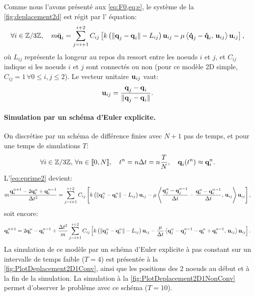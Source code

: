 \noindent Comme nous l'avons présenté aux \cref{eq:F0,eq:e}, le système de la \cref{fig:deplacement2d} est régit par l' équation:
\begin{align} \label{eq:eprime2}
    \forall i \in \mathbb{Z}/3\mathbb{Z}, \quad m \ddot{\bm{\mathrm{q}}}_i = \sum_{j=i+1}^{i+2}C_{ij} \left[  k \left( \Vert \bm{\mathrm{q}}_j - \bm{\mathrm{q}}_i \Vert - L_{ij} \right) \bm{\mathrm{u}}_{ij} - \mu \left\langle \bm{\mathrm{\dot{q}}}_j - \bm{\mathrm{\dot{q}}}_i, \, \bm{\mathrm{u}}_{ij}  \right\rangle  \bm{\mathrm{u}}_{ij}  \right]  , 
\end{align}
où $L_{ij}$ représente la longeur au repos du ressort entre les noeuds $i$ et $j$, et $C_{ij}$ indique si les noeuds $i$ et $j$ sont connectés ou non (pour ce modèle 2D simple, $C_{ij} = 1 \, \forall 0 \leq i,j \leq 2$). Le vecteur unitaire $\bm{\mathrm{u}}_{ij}$ vaut:
$$
\bm{\mathrm{u}}_{ij} = \frac{\bm{\mathrm{q}}_j - \bm{\mathrm{q}}_i}{\Vert \bm{\mathrm{q}}_j - \bm{\mathrm{q}}_i \Vert}.
$$


\paragraph{Simulation par un schéma d'Euler explicite.}

On discrétise par un schéma de différence finies avec $N+1$ pas de temps, et pour une temps de simulations $T$:
$$
\forall i \in \mathbb{Z}/3\mathbb{Z}, \, \forall n \in [\![ 0,N ]\!], \quad  t^n = n\Delta t = n\frac{T}{N}, \quad \bm{\mathrm{q}}_i(t^n) \approx \bm{\mathrm{q}}_i^n.
$$
L'\cref{eq:eprime2} devient:
$$
m\frac{\bm{\mathrm{q}}_{i}^{n+1}-2\bm{\mathrm{q}}_{i}^{n}+\bm{\mathrm{q}}_{i}^{n-1}}{\Delta t^2} = \sum_{j=i+1}^{i+2}C_{ij}\left[ k \left( \Vert \bm{\mathrm{q}}_j^n - \bm{\mathrm{q}}_i^n \Vert - L_{ij} \right) \bm{\mathrm{u}}_{ij} - \mu \left\langle \frac{\bm{\mathrm{q}}_{j}^{n}-\bm{\mathrm{q}}_{j}^{n-1}}{\Delta t} - \frac{\bm{\mathrm{q}}_{i}^{n}-\bm{\mathrm{q}}_{i}^{n-1}}{\Delta t}, \, \bm{\mathrm{u}}_{ij} \right\rangle  \bm{\mathrm{u}}_{ij}  \right],
$$
soit encore:
\begin{align} \label{eq:systeme2D}
    \bm{\mathrm{q}}_{i}^{n+1} = 2\bm{\mathrm{q}}_{i}^{n}-\bm{\mathrm{q}}_{i}^{n-1} + \frac{\Delta t^2}{m} \sum_{j=i+1}^{i+2}C_{ij}\left[ k \left( \Vert \bm{\mathrm{q}}_j^n - \bm{\mathrm{q}}_i^n \Vert - L_{ij} \right) \bm{\mathrm{u}}_{ij} - \frac{\mu}{\Delta t} \left\langle \bm{\mathrm{q}}_{j}^{n}-\bm{\mathrm{q}}_{j}^{n-1} - \bm{\mathrm{q}}_{i}^{n}+\bm{\mathrm{q}}_{i}^{n-1}, \, \bm{\mathrm{u}}_{ij} \right\rangle  \bm{\mathrm{u}}_{ij}  \right].
\end{align}
La simulation de ce modèle par un schéma d'Euler explicite à pas constant sur un intervalle de temps faible ($T = 4$) est présentée à la \cref{fig:PlotDeplacement2D1Conv}, ainsi que les positions des 2 noeuds au début et à la fin de la simulation. La simulation à la \cref{fig:PlotDeplacement2D1NonConv} permet d'observer le problème avec ce schéma ($T = 10$).


